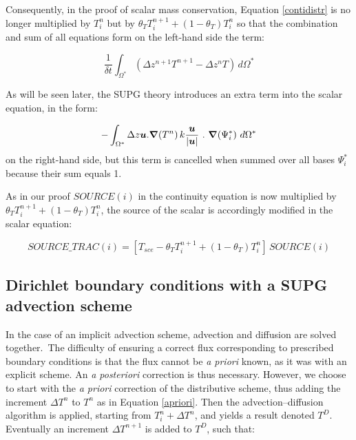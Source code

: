 Consequently, in the proof of scalar mass conservation, Equation
\ref{contidistr} is no longer multiplied by $T_{i}^{n}$ but by $\theta
_{T}T_{i}^{n+1}+(1-\theta_{T})T_{i}^{n}$ so that the combination and sum of
all equations form on the left-hand side the term:%

\begin{equation}
\dfrac{1}{\delta t}\int_{\Omega^{\ast}}(\Delta z^{n+1}T^{n+1}-\Delta
z^{n}T)\,d\Omega^{\ast}%
\end{equation}


As will be seen later, the SUPG theory introduces an extra term into the
scalar equation, in the form:%

\begin{equation}
-\int_{\Omega^{\ast}}\Delta z\vec{u}.\Grad%
(T^{n})\,k\dfrac{\vec{u}}{\left\vert \vec{u}\right\vert
}~.~\Grad(\Psi_{i}^{\ast})~d\Omega^{\ast}%
\end{equation}
on the right-hand side, but this term is cancelled when summed over all bases
$\Psi_{i}^{\ast}$ because their sum equals 1.

As in our proof $SOURCE(i)$ in the continuity equation is now multiplied by
$\theta_{T}T_{i}^{n+1}+(1-\theta_{T})T_{i}^{n}$, the source of the scalar is
accordingly modified in the scalar equation:%

\begin{equation}
SOURCE\_TRAC(i)=\left[  T_{sce}-\theta_{T}T_{i}^{n+1}+(1-\theta_{T})T_{i}%
^{n}\right]  \,SOURCE(i)
\end{equation}


\subsection{Dirichlet boundary conditions with a SUPG advection scheme%
%
}

In the case of an implicit advection scheme, advection and diffusion are
solved together.\ The difficulty of ensuring a correct flux corresponding to
prescribed boundary conditions is that the flux cannot be \textit{a priori}
known, as it was with an explicit scheme. An \textit{a posteriori} correction
is thus necessary. However, we choose to start with the \textit{a priori}
correction of the distributive scheme, thus adding the increment $\Delta
T^{n}$ to $T^{n}$ as in Equation \ref{apriori}. Then the advection--diffusion
algorithm is applied, starting from $T_{i}^{n}+\Delta T^{n}$, and yields a
result denoted $T^{D}$. Eventually an increment $\Delta T^{n+1}$ is added to
$T^{D}$, such that:%

